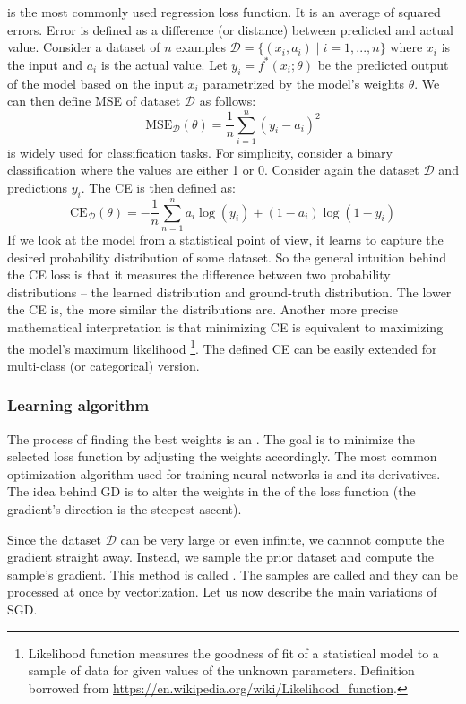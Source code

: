  is the most commonly used regression loss
function. It is an average of squared errors. Error is defined as a difference
(or distance) between predicted and actual value. Consider a dataset of $n$
examples $\mathcal{D} = \{(x_i, a_i)\mid i = 1,...,n\}$ where $x_i$ is the input
and $a_i$ is the actual value. Let $y_i = f^*(x_i; \theta)$ be the predicted
output of the model based on the input $x_i$ parametrized by the model's weights
$\theta$. We can then define MSE of dataset $\mathcal{D}$ as follows:
$$
    \text{MSE}_{\mathcal{D}}(\theta) =
    \frac{1}{n}\sum\limits^{n}_{i=1}(y_i - a_i)^2
$$
 is widely used for classification tasks. For
simplicity, consider a binary classification where the values are either 1 or 0.
Consider again the dataset $\mathcal{D}$ and predictions $y_i$. The CE is then
defined as:
$$
    \text{CE}_\mathcal{D}(\theta) =
    -\frac{1}{n}\sum\limits_{n=1}^{n} a_i \log(y_i) + (1-a_i)\log(1-y_i)
$$
If we look at the model from a statistical point of view, it learns to capture
the desired probability distribution of some dataset. So the general intuition
behind the CE loss is that it measures the difference between two probability
distributions -- the learned distribution and ground-truth distribution. The
lower the CE is, the more similar the distributions are. Another more precise
mathematical interpretation is that minimizing CE is equivalent to maximizing
the model's maximum likelihood
\footnote{
    Likelihood function measures the goodness of fit of a statistical model to
    a sample of data for given values of the unknown parameters. Definition
    borrowed from \url{https://en.wikipedia.org/wiki/Likelihood_function}.
}. The defined CE can be easily extended for multi-class (or categorical)
version.

\subsubsection{Learning algorithm}
The process of finding the best weights is an . The
goal is to minimize the selected loss function by adjusting the weights
accordingly. The most common optimization algorithm used for training neural
networks is  and its derivatives. The idea behind GD
is to alter the weights in the  of the
loss function (the gradient's direction is the steepest ascent).

Since the dataset $\mathcal{D}$ can be very large or even infinite, we cannnot
compute the gradient straight away. Instead, we sample the prior dataset and
compute the sample's gradient. This method is called . The samples are called  and they can be
processed at once by vectorization. Let us now describe the main variations of
SGD.

